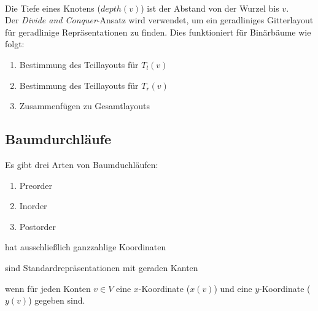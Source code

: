 \\
Die Tiefe eines Knotens ($depth(v)$) ist der Abstand von der Wurzel bis $v$.\\
Der \textit{Divide and Conquer}-Ansatz wird verwendet, um ein geradliniges Gitterlayout für geradlinige Repräsentationen zu finden. Dies funktioniert für Binärbäume wie folgt:
\begin{enumerate}[itemsep=-1pt]
	\item Bestimmung des Teillayouts für $T_l(v)$
	\item Bestimmung des Teillayouts für $T_r(v)$
	\item Zusammenfügen zu Gesamtlayouts
\end{enumerate}
\subsection{Baumdurchläufe}
Es gibt drei Arten von Baumduchläufen:
\begin{enumerate}[itemsep=-1pt]
	\item Preorder
	\item Inorder
	\item Postorder
\end{enumerate}
\begin{description}[itemsep=-1pt]
	\item[Ein Gitterlayout] hat ausschließlich ganzzahlige Koordinaten
	\item[Geradlinige Repräsentationen] sind Standardrepräsentationen mit geraden Kanten
	\item[Ein Layout ist vollatändig bestimmt,] wenn  für jeden Konten $v\in V$ eine $x$-Koordinate ($x(v)$) und eine $y$-Koordinate ($y(v)$) gegeben sind.
\end{description}
